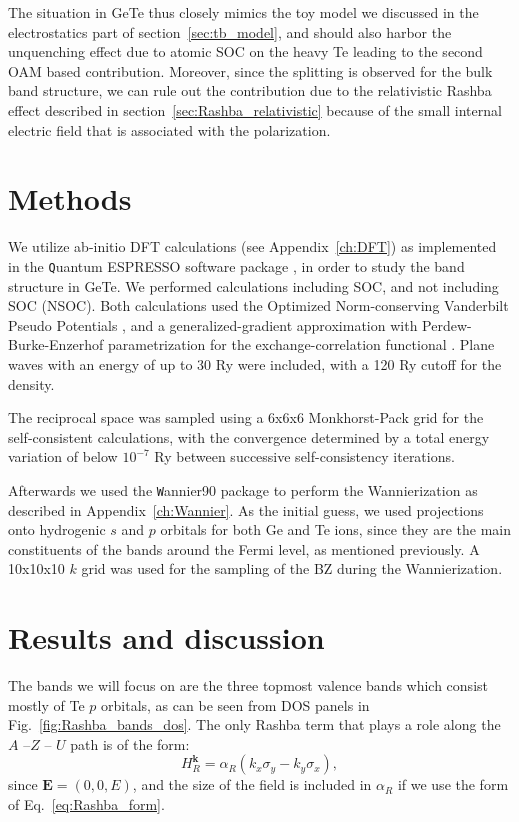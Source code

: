 The situation in GeTe thus closely mimics the toy model we discussed in the electrostatics part of section~\ref{sec:tb_model}, and should also harbor the unquenching effect due to atomic SOC on the heavy Te leading to the second OAM based contribution.
Moreover, since the splitting is observed for the bulk band structure, we can rule out the contribution due to the relativistic Rashba effect described in section~\ref{sec:Rashba_relativistic} because of the small internal electric field that is associated with the polarization.

\section{Methods}
We utilize ab-initio DFT calculations (see Appendix~\ref{ch:DFT}) as implemented in the {\texttt Quantum ESPRESSO} software package \cite{Giannozzi2009}, in order to study the band structure in GeTe.
We performed calculations including SOC, and not including SOC (NSOC). 
Both calculations used the Optimized Norm-conserving Vanderbilt Pseudo Potentials \cite{Hamann2013}, and a generalized-gradient approximation \cite{Perdew1993} with Perdew-Burke-Enzerhof parametrization for the exchange-correlation functional \cite{Perdew1996}.
Plane waves with an energy of up to 30 Ry were included, with a 120 Ry cutoff for the density.

The reciprocal space was sampled using a 6x6x6 Monkhorst-Pack grid \cite{Pack1977} for the self-consistent calculations, with the convergence determined by a total energy variation of below $10^{-7}$ Ry between successive self-consistency iterations.

Afterwards we used the {\texttt Wannier90} package \cite{Mostofi2014AnFunctions} to perform the Wannierization as described in Appendix~\ref{ch:Wannier}.
As the initial guess, we used projections onto hydrogenic $s$ and $p$ orbitals for both Ge and Te ions, since they are the main constituents of the bands around the Fermi level, as mentioned previously.
A 10x10x10 $k$ grid was used for the sampling of the BZ during the Wannierization. 

\section{Results and discussion \label{sec:Rashba_results}}

The bands we will focus on are the three topmost valence bands which consist mostly of Te $p$ orbitals, as can be seen from DOS panels in Fig.~\ref{fig:Rashba_bands_dos}.
The only Rashba term that plays a role along the $A$ --$Z$ -- $U$ path is of the form:
\begin{equation}
	H_R^{\bm k} = \alpha_R (k_x \sigma_y - k_y \sigma_x),
\end{equation}
since $\bm E = (0, 0, E)$, and the size of the field is included in $\alpha_R$ if we use the form of Eq.~\eqref{eq:Rashba_form}.
    
